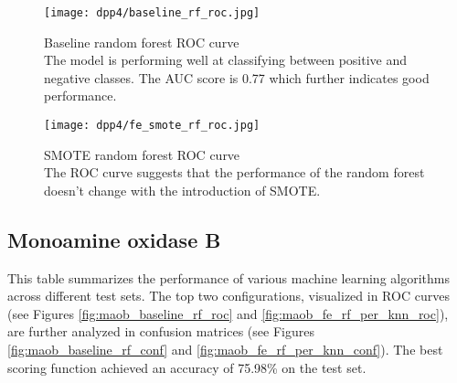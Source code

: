 \begin{figure}[H]
    \begin{center}
        \captionsetup{justification=centering}
        \texttt{[image: dpp4/baseline\_rf\_roc.jpg]}
        \caption[]{Baseline random forest ROC curve\\
            The model is performing well at classifying between positive and negative classes. The AUC score is 0.77 which further indicates good performance.
        }
        \label{fig:dpp4_baseline_rf_roc}
    \end{center}
\end{figure}

\begin{figure}[H]
    \begin{center}
        \captionsetup{justification=centering}
        \texttt{[image: dpp4/fe\_smote\_rf\_roc.jpg]}
        \caption[]{SMOTE random forest ROC curve\\
            The ROC curve suggests that the performance of the random forest doesn't change with the introduction of SMOTE.
        }
        \label{fig:dpp4_smote_rf_roc}
    \end{center}
\end{figure}

\subsection{Monoamine oxidase B}
This table summarizes the performance of various machine learning algorithms across different test sets.
The top two configurations, visualized in ROC curves (see Figures \ref{fig:maob_baseline_rf_roc} and \ref{fig:maob_fe_rf_per_knn_roc}),
are further analyzed in confusion matrices (see Figures \ref{fig:maob_baseline_rf_conf} and \ref{fig:maob_fe_rf_per_knn_conf}).
The best scoring function achieved an accuracy of 75.98\% on the test set.

